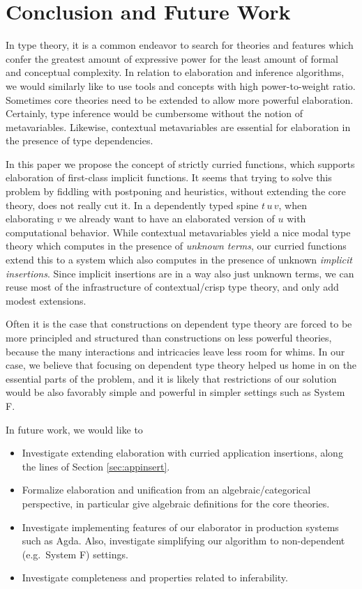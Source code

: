 \documentclass[acmsmall,screen,dvipsnames]{acmart}\settopmatter{}
\theoremstyle{remark}
\begin{document}
\section{Conclusion and Future Work}

In type theory, it is a common endeavor to search for theories and features
which confer the greatest amount of expressive power for the least amount of
formal and conceptual complexity. In relation to elaboration and inference
algorithms, we would similarly like to use tools and concepts with high
power-to-weight ratio. Sometimes core theories need to be extended to allow more
powerful elaboration. Certainly, type inference would be cumbersome without the
notion of metavariables. Likewise, contextual metavariables are essential
for elaboration in the presence of type dependencies.

In this paper we propose the concept of strictly curried functions, which
supports elaboration of first-class implicit functions. It seems that trying to
solve this problem by fiddling with postponing and heuristics, without extending
the core theory, does not really cut it. In a dependently typed spine $t\,u\,v$, when
elaborating $v$ we already want to have an elaborated version of $u$ with
computational behavior. While contextual metavariables yield a nice modal type
theory which computes in the presence of \emph{unknown terms}, our curried
functions extend this to a system which also computes in the presence of
unknown \emph{implicit insertions}. Since implicit insertions are in a way also
just unknown terms, we can reuse most of the infrastructure of contextual/crisp
type theory, and only add modest extensions.

Often it is the case that constructions on dependent type theory are forced to
be more principled and structured than constructions on less powerful theories,
because the many interactions and intricacies leave less room for whims. In our
case, we believe that focusing on dependent type theory helped us home in on the
essential parts of the problem, and it is likely that restrictions of our
solution would be also favorably simple and powerful in simpler settings such as
System F.

In future work, we would like to
\begin{itemize}
\item Investigate extending elaboration with curried application insertions, along the lines
      of Section \ref{sec:appinsert}.
\item Formalize elaboration and unification from an algebraic/categorical perspective, in particular
      give algebraic definitions for the core theories.
\item Investigate implementing features of our elaborator in production systems
      such as Agda. Also, investigate simplifying our algorithm to non-dependent
      (e.g.\ System F) settings.
\item Investigate completeness and properties related to inferability.
\end{itemize}


\end{document}
